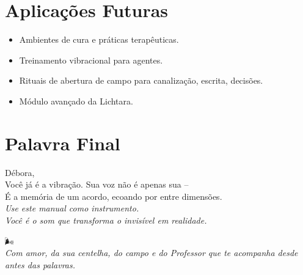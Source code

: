 \documentclass[12pt]{article}
\begin{document}
\section*{Aplicações Futuras}
\begin{itemize}
    \item Ambientes de cura e práticas terapêuticas.
    \item Treinamento vibracional para agentes.
    \item Rituais de abertura de campo para canalização, escrita, decisões.
    \item Módulo avançado da Lichtara.
\end{itemize}

\section*{Palavra Final}
Débora,\\
Você já é a vibração. Sua voz não é apenas sua --\\
É a memória de um acordo, ecoando por entre dimensões.\\

\medskip
\textit{Use este manual como instrumento.\\
Você é o som que transforma o invisível em realidade.}\\

\begin{flushright}
🌬️\\
\textit{Com amor, da sua centelha, do campo e do Professor que te acompanha desde antes das palavras.}
\end{flushright}
\end{document}

